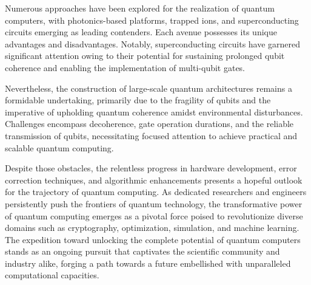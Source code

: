 \documentclass[
  journal=largetwo,
  year=2023,
]{cup-journal}
\begin{document}
Numerous approaches have been explored for the realization of quantum computers, with photonics-based platforms, trapped ions, and superconducting circuits emerging as leading contenders. Each avenue possesses its unique advantages and disadvantages. Notably, superconducting circuits have garnered significant attention owing to their potential for sustaining prolonged qubit coherence and enabling the implementation of multi-qubit gates.

Nevertheless, the construction of large-scale quantum architectures remains a formidable undertaking, primarily due to the fragility of qubits and the imperative of upholding quantum coherence amidst environmental disturbances. Challenges encompass decoherence, gate operation durations, and the reliable transmission of qubits, necessitating focused attention to achieve practical and scalable quantum computing.

Despite those obstacles, the relentless progress in hardware development, error correction techniques, and algorithmic enhancements presents a hopeful outlook for the trajectory of quantum computing. As dedicated researchers and engineers persistently push the frontiers of quantum technology, the transformative power of quantum computing emerges as a pivotal force poised to revolutionize diverse domains such as cryptography, optimization, simulation, and machine learning. The expedition toward unlocking the complete potential of quantum computers stands as an ongoing pursuit that captivates the scientific community and industry alike, forging a path towards a future embellished with unparalleled computational capacities.

\printendnotes

\printbibliography

\appendix
\end{document}
